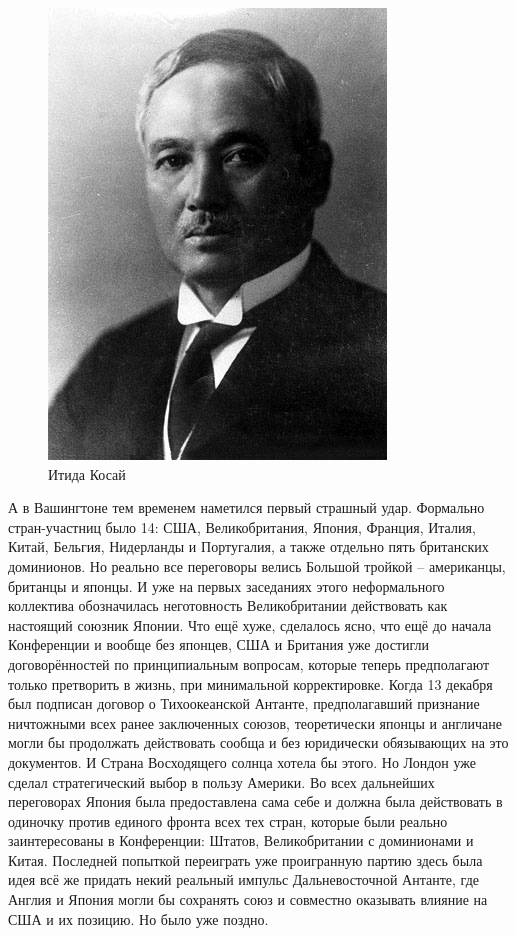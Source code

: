 \begin{figure}[h!tb] 
	\centering\includegraphics[scale=0.5]{Glava7/d68MMABuGZw.jpg}
	\caption{Итида Косай}%
\end{figure}


А в Вашингтоне тем временем наметился первый страшный удар. Формально стран-участниц было 14: США, Великобритания, Япония, Франция, Италия, Китай, Бельгия, Нидерланды и Португалия, а также отдельно пять британских доминионов. Но реально все переговоры велись Большой тройкой – американцы, британцы и японцы. И уже на первых заседаниях этого неформального коллектива обозначилась неготовность Великобритании действовать как настоящий союзник Японии. Что ещё хуже, сделалось ясно, что ещё до начала Конференции и вообще без японцев, США и Британия уже достигли договорённостей по принципиальным вопросам, которые теперь предполагают только претворить в жизнь, при минимальной корректировке. Когда 13 декабря был подписан договор о Тихоокеанской Антанте, предполагавший признание ничтожными всех ранее заключенных союзов, теоретически японцы и англичане могли бы продолжать действовать сообща и без юридически обязывающих на это документов. И Страна Восходящего солнца хотела бы этого. Но Лондон уже сделал стратегический выбор в пользу Америки. Во всех дальнейших переговорах Япония была предоставлена сама себе и должна была действовать в одиночку против единого фронта всех тех стран, которые были реально заинтересованы в Конференции: Штатов, Великобритании с доминионами и Китая. Последней попыткой переиграть уже проигранную партию здесь была идея всё же придать некий реальный импульс Дальневосточной Антанте, где Англия и Япония могли бы сохранять союз и совместно оказывать влияние на США и их позицию. Но было уже поздно.

